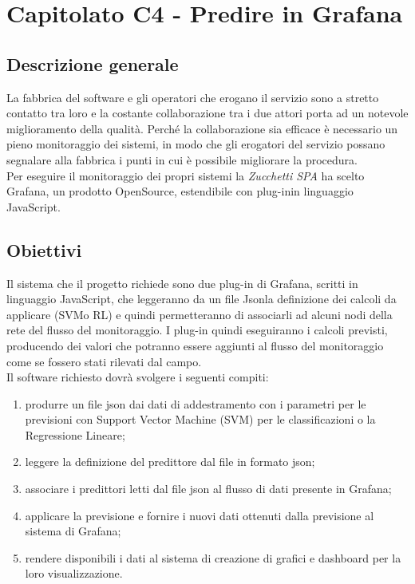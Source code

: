 \section{Capitolato C4 - Predire in Grafana}

\subsection{Descrizione generale}
La fabbrica del software e gli operatori che erogano il servizio sono a stretto contatto tra loro e la costante collaborazione tra i due attori porta ad un notevole miglioramento della qualità. Perché la collaborazione sia efficace è necessario un pieno monitoraggio dei sistemi, in modo che gli erogatori del servizio possano segnalare alla fabbrica i punti in cui è possibile migliorare la procedura. \\
Per eseguire il monitoraggio dei propri sistemi la \textit{Zucchetti SPA} ha scelto Grafana\glo, un prodotto OpenSource, estendibile con plug-in\glo in linguaggio JavaScript.



\subsection{Obiettivi}
Il sistema che il progetto richiede sono due plug-in di Grafana, scritti in linguaggio JavaScript, che leggeranno da un file Json\glo la definizione dei calcoli da applicare (SVM\glo o RL\glo) e quindi permetteranno di associarli ad alcuni nodi della rete del flusso del monitoraggio. I plug-in quindi eseguiranno i calcoli previsti, producendo dei valori che potranno essere aggiunti al flusso del monitoraggio come se fossero stati rilevati dal campo.\\
Il software richiesto dovrà svolgere i seguenti compiti: \begin{enumerate}
\item produrre un file json dai dati di addestramento con i parametri per le previsioni con Support Vector Machine (SVM) per le classificazioni o la Regressione Lineare;
\item leggere la definizione del predittore dal file in formato json;
\item associare i predittori letti dal file json al flusso di dati presente in Grafana;
\item applicare la previsione e fornire i nuovi dati ottenuti dalla previsione al sistema di Grafana;
\item rendere disponibili i dati al sistema di creazione di grafici e dashboard per la loro visualizzazione.
\end{enumerate}


